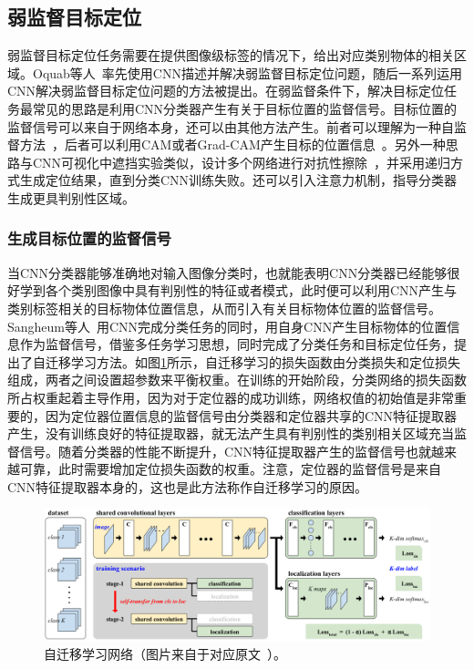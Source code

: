 \subsection{弱监督目标定位}
弱监督目标定位任务需要在提供图像级标签的情况下，给出对应类别物体的相关区域。Oquab等人~\cite{Oquab2015IsOL}率先使用CNN描述并解决弱监督目标定位问题，随后一系列运用CNN解决弱监督目标定位问题的方法被提出。在弱监督条件下，解决目标定位任务最常见的思路是利用CNN分类器产生有关于目标位置的监督信号。目标位置的监督信号可以来自于网络本身，还可以由其他方法产生。前者可以理解为一种自监督方法~\cite{2015Hwang}，后者可以利用CAM或者Grad-CAM产生目标的位置信息~\cite{Kim_2017_ICCV, Krishna2018}。另外一种思路与CNN可视化中遮挡实验类似，设计多个网络进行对抗性擦除~\cite{WeiFLCZY17, ZhangWF0H18}，并采用递归方式生成定位结果，直到分类CNN训练失败。还可以引入注意力机制，指导分类器生成更具判别性区域。

\subsubsection*{生成目标位置的监督信号}
当CNN分类器能够准确地对输入图像分类时，也就能表明CNN分类器已经能够很好学到各个类别图像中具有判别性的特征或者模式，此时便可以利用CNN产生与类别标签相关的目标物体位置信息，从而引入有关目标物体位置的监督信号。Sangheum等人~\cite{2015Hwang}用CNN完成分类任务的同时，用自身CNN产生目标物体的位置信息作为监督信号，借鉴多任务学习思想，同时完成了分类任务和目标定位任务，提出了自迁移学习方法。如图\ref{fig:self_transfer_learning}所示，自迁移学习的损失函数由分类损失和定位损失组成，两者之间设置超参数来平衡权重。在训练的开始阶段，分类网络的损失函数所占权重起着主导作用，因为对于定位器的成功训练，网络权值的初始值是非常重要的，因为定位器位置信息的监督信号由分类器和定位器共享的CNN特征提取器产生，没有训练良好的特征提取器，就无法产生具有判别性的类别相关区域充当监督信号。随着分类器的性能不断提升，CNN特征提取器产生的监督信号也就越来越可靠，此时需要增加定位损失函数的权重。注意，定位器的监督信号是来自CNN特征提取器本身的，这也是此方法称作自迁移学习的原因。

\begin{figure}[h]
	\centering
	\includegraphics[width=1.0\textwidth]{figure/self_transfer_learning}
	\caption[自迁移学习网络]{自迁移学习网络（图片来自于对应原文~\cite{2015Hwang}）。} 
	\label{fig:self_transfer_learning}
\end{figure}

